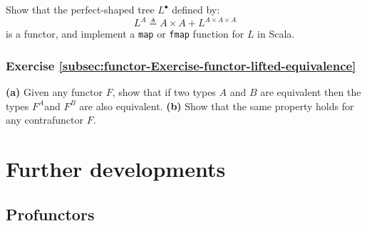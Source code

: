 Show that the perfect-shaped tree $L^{\bullet}$ defined by:
\[
L^{A}\triangleq A\times A+L^{A\times A\times A}
\]
is a functor, and implement a \lstinline!map! or \lstinline!fmap!
function for $L$ in Scala.

\subsubsection{Exercise \label{subsec:functor-Exercise-functor-lifted-equivalence}\ref{subsec:functor-Exercise-functor-lifted-equivalence}}

\textbf{(a)} Given any functor $F$, show that if two types $A$ and
$B$ are equivalent then the types $F^{A}$and $F^{B}$ are also equivalent.
\textbf{(b)} Show that the same property holds for any contrafunctor
$F$.

\section{Further developments}

\subsection{Profunctors\label{subsec:f-Profunctors}}

